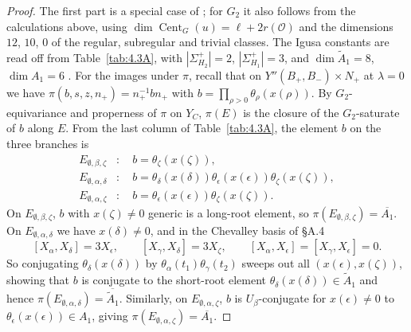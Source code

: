 \documentclass[12pt,letterpaper]{amsart}
\theoremstyle{plain}
\theoremstyle{definition}
\theoremstyle{remark}
\theoremstyle{definition}
\DeclareMathOperator{\Cent}{Cent}
\begin{document}
\begin{proof}
The first part is a special case of
\cite[Ch.~II, Proposition~9.1]{Ha92a}; for $G_2$ it also follows
from the calculations above, using $\dim\Cent_G(u)=\ell+2r(\mathcal O)$ and
the dimensions $12$, $10$, $0$ of the regular, subregular and trivial classes.
The Igusa constants are read off from Table~\ref{tab:4.3A}, with
$|\Sigma_{H_2}^+|=2$, $|\Sigma_{H_1}^+|=3$, and $\dim\tilde A_1=8$,
$\dim A_1=6$ \cite{Spa82}. For the images under $\pi$, recall that on
$Y''(B_+,B_-)\times N_+$ at $\lambda=0$ we have $\pi(b,s,z,n_+)=n_+^{-1}bn_+$
with $b=\prod_{\rho>0}\theta_\rho(x(\rho))$. By $G_2$-equivariance and
properness of $\pi$ on $Y_C$, $\pi(E)$ is the closure of the $G_2$-saturate of
$b$ along $E$. From the last column of Table~\ref{tab:4.3A}, the element
$b$ on the three branches is
\begin{align*}
E_{\emptyset,\beta,\zeta}&:\quad b=\theta_\zeta(x(\zeta)),\\
E_{\emptyset,\alpha,\delta}&:\quad b=\theta_\delta(x(\delta))\theta_\epsilon(x(\epsilon))
\theta_\zeta(x(\zeta)),\\
E_{\emptyset,\alpha,\zeta}&:\quad b=\theta_\epsilon(x(\epsilon))\theta_\zeta(x(\zeta)).
\end{align*}
On $E_{\emptyset,\beta,\zeta}$, $b$ with $x(\zeta)\neq0$
generic is a long-root element, so $\pi(E_{\emptyset,\beta,\zeta})=\overline{A_1}$.
On $E_{\emptyset,\alpha,\delta}$ we have $x(\delta)\neq0$, and in the
Chevalley basis of \S A.4
\[
[X_\alpha,X_\delta]=3X_\epsilon,\qquad [X_\gamma,X_\delta]=3X_\zeta,\qquad
[X_\alpha,X_\epsilon]=[X_\gamma,X_\epsilon]=0.
\]
So conjugating $\theta_\delta(x(\delta))$ by $\theta_\alpha(t_1)\theta_\gamma(t_2)$
sweeps out all $(x(\epsilon),x(\zeta))$, showing that $b$ is conjugate to the
short-root element $\theta_\delta(x(\delta))\in\tilde A_1$ and hence
$\pi(E_{\emptyset,\alpha,\delta})=\overline{\tilde A_1}$. Similarly, on
$E_{\emptyset,\alpha,\zeta}$, $b$
is $U_\beta$-conjugate for $x(\epsilon)\neq0$ to $\theta_\epsilon(x(\epsilon))\in A_1$,
giving $\pi(E_{\emptyset,\alpha,\zeta})=\overline{A_1}$.
\end{proof}
\end{document}

